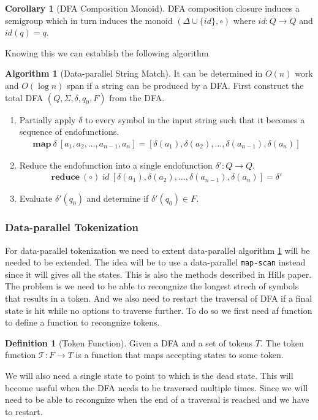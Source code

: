 \documentclass[a4paper,12pt]{article}
\theoremstyle{definition}
\newtheorem{definition}{Definition}[section]
\newtheorem{corollary}{Corollary}[section]
\newtheorem{algorithm}{Algorithm}[section]
\begin{document}
\begin{corollary}[DFA Composition Monoid]
  DFA composition closure induces a semigroup which in turn induces the monoid $(\Delta \cup \{id\}, \circ)$ where $id: Q \to Q$ and $id(q) = q$.
\end{corollary}
\noindent Knowing this we can establish the following algorithm
\begin{algorithm}[Data-parallel String Match]\label{algo:lex}
  It can be determined in $O(n)$ work and $O(\log n)$ span if a string can be produced by a DFA. First construct the total DFA $(Q, \Sigma, \delta, q_0, F)$ from the DFA.
  \begin{enumerate}
    \item Partially apply $\delta$ to every symbol in the input string such that it becomes a sequence of endofunctions.
    \begin{align*}
      \mathbf{map}\: \delta \: [a_1, a_2, \dots, a_{n - 1}, a_n] = [\delta(a_1), \delta(a_2), \dots, \delta(a_{n - 1}), \delta(a_n)]
    \end{align*}
    \item Reduce the endofunction into a single endofunction $\delta': Q \to Q$. \begin{align*}
      \mathbf{reduce} \: (\circ) \: id \: [\delta(a_1), \delta(a_2), \dots, \delta(a_{n - 1}), \delta(a_n)] = \delta'
    \end{align*}
    \item Evaluate $\delta'(q_0)$ and determine if $\delta'(q_0) \in F$.
  \end{enumerate}
\end{algorithm}

\subsubsection{Data-parallel Tokenization}
For data-parallel tokenization we need to extent data-parallel algorithm \ref{algo:lex} will be needed to be extended. The idea will be to use a data-parallel \texttt{map-scan} instead since it will gives all the states. This is also the methods described in Hills \cite{HILL1992699} paper. The problem is we need to be able to recongnize the longest strech of symbols that results in a token. And we also need to restart the traversal of DFA if a final state is hit while no options to traverse further. To do so we first need af function to define a function to recongnize tokens.

\begin{definition}[Token Function]
  Given a DFA and a set of tokens $T$. The token function $\mathcal{T}: F \to T$ is a function that maps accepting states to some token.
\end{definition}
\noindent We will also need a single state to point to which is the dead state. This will become useful when the DFA needs to be traversed multiple times. Since we will need to be able to recongnize when the end of a traversal is reached and we have to restart.
\end{document}
